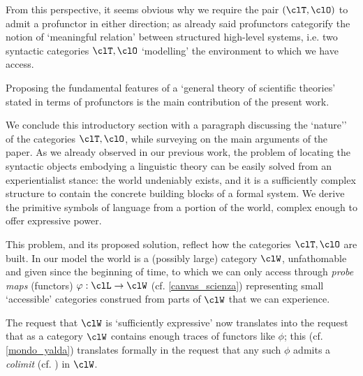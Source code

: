 From this perspective, it seems obvious why we require the pair $(\clT,\clO)$ to admit a profunctor in either direction; as already said profunctors categorify the notion of `meaningful relation' between structured high-level systems, i.e. two syntactic categories $\clT,\clO$ `modelling' the environment to which we have access.

Proposing the fundamental features of a `general theory of scientific theories' stated in terms of profunctors is the main contribution of the present work.

\medskip
We conclude this introductory section with a paragraph discussing the `nature'' of the categories $\clT,\clO$, while surveying on the main arguments of the paper.
As we already observed in our previous work, the problem of locating the syntactic objects embodying a linguistic theory can be easily solved from an experientialist stance: the world undeniably exists, and it is a sufficiently complex structure to contain the concrete building blocks of a formal system. We derive the primitive symbols of language from a portion of the world, complex enough to offer expressive power.

This problem, and its proposed solution, reflect how the categories $\clT,\clO$ are built. In our model the world is a (possibly large) category $\clW$, unfathomable and given since the beginning of time, to which we can only access through \emph{probe maps} (functors) $\phi : \clL \to \clW$ (cf. \autoref{canvas_scienza}) representing small `accessible' categories construed from parts of $\clW$ that we can experience.

The request that $\clW$ is `sufficiently expressive' now translates into the request that as a category $\clW$ contains enough traces of functors like $\phi$; this (cf. \autoref{mondo_yalda}) translates formally in the request that any such $\phi$ admits a \emph{colimit} (cf. \cite[Ch. 2]{Bor1}) in $\clW$.

